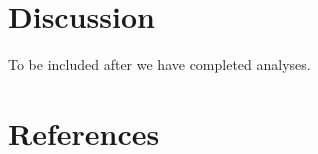 \documentclass[
  english,
  man]{apa6}
\newlength{\cslhangindent}
\newlength{\cslentryspacingunit} %
\newenvironment{CSLReferences}[2] %
 {%
  \setlength{\parindent}{0pt}
  \ifodd #1
  \let\oldpar\par
  \def\par{\hangindent=\cslhangindent\oldpar}
  \fi
  \setlength{\parskip}{#2\cslentryspacingunit}
 }%
 {}
\begin{document}
\hypertarget{discussion}{%
\section{Discussion}\label{discussion}}

To be included after we have completed analyses.

\newpage

\hypertarget{references}{%
\section{References}\label{references}}

\begingroup
\setlength{\parindent}{-0.5in}
\setlength{\leftskip}{0.5in}

\hypertarget{refs}{}
\begin{CSLReferences}{0}{0}
\end{CSLReferences}

\endgroup
\end{document}
